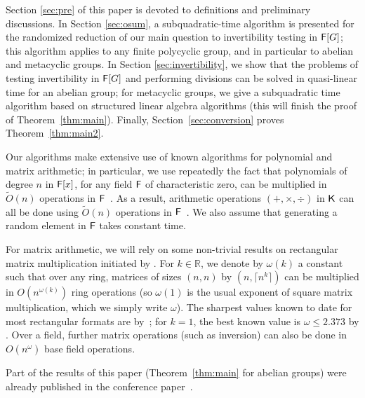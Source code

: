 Section \ref{sec:pre} of this paper is devoted to definitions and
preliminary discussions.  In Section \ref{sec:osum}, a
subquadratic-time algorithm is presented for the randomized reduction
of our main question to invertibility testing in ${\mathsf{F}}[G]$; this
algorithm applies to any finite polycyclic group, and in particular to
abelian and metacyclic groups. In Section \ref{sec:invertibility}, we
show that the problems of testing invertibility in ${\mathsf{F}}[G]$ and
performing divisions can be solved in quasi-linear time for an abelian
group; for metacyclic groups, we give a subquadratic time algorithm
based on structured linear algebra algorithms (this will finish the
proof of Theorem~\ref{thm:main}). Finally,
Section~\ref{sec:conversion} proves Theorem~\ref{thm:main2}.

Our algorithms make extensive use of known algorithms for polynomial and
matrix arithmetic; in particular, we use repeatedly the fact that
polynomials of degree $n$ in ${\mathsf{F}}[x]$, for any field ${\mathsf{F}}$ of
characteristic zero, can be multiplied in $\tilde{O}(n)$ operations in
${\mathsf{F}}$~\citep{ScSt71}. As a result, arithmetic operations
$(+,\times,\div)$ in ${\mathsf{K}}$ can all be done using $\tilde{O}(n)$
operations in ${\mathsf{F}}$~\citep{vzGathen13}. We also assume that generating a
random element in ${\mathsf{F}}$ takes constant time.

For matrix arithmetic, we will rely on some non-trivial results on
rectangular matrix multiplication initiated by \cite{LoRo83}. For $k
\in \mathbb{R}$, we denote by $\omega(k)$ a constant such that over
any ring, matrices of sizes $(n,n)$ by $(n,\lceil n^k \rceil)$ can be
multiplied in $O(n^{\omega(k)})$ ring operations (so $\omega(1)$ is
the usual exponent of square matrix multiplication, which we simply
write $\omega$).  The sharpest values known to date for most
rectangular formats are by~\cite{LeGall}; for $k=1$, the best known
value is $\omega \le 2.373$ by .  Over a field,
further matrix operations (such as inversion) can also be done in
$O(n^\omega)$ base field operations.

Part of the results of this paper (Theorem~\ref{thm:main} for abelian
groups) were already published in the conference
paper~\citep{GiJaSc19}.

